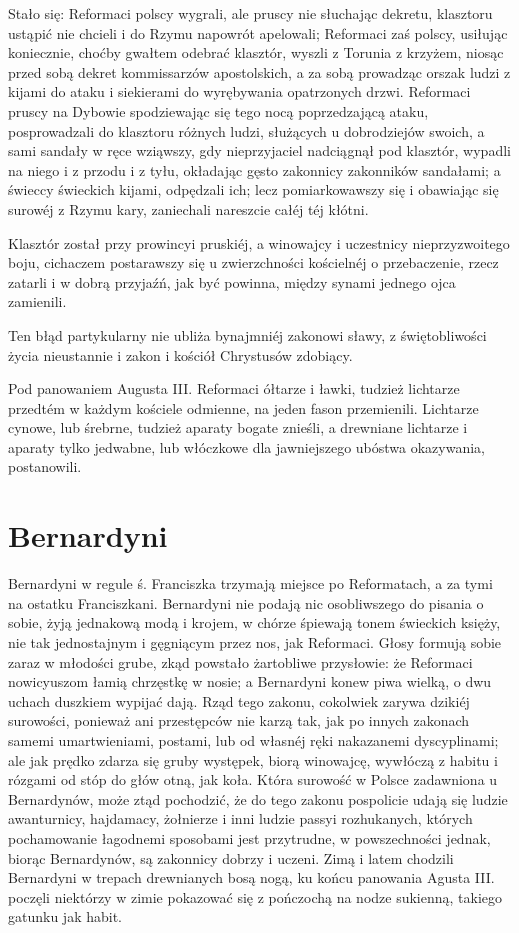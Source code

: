 \documentclass{book}
\begin{document}
Stało się: Reformaci polscy wygrali, ale pruscy nie słuchając dekretu, klasztoru ustąpić nie chcieli i do Rzymu napowrót apelowali; Reformaci zaś polscy, usiłując koniecznie, choćby gwałtem odebrać klasztór, wyszli z Torunia z krzyżem, niosąc przed sobą dekret kommissarzów apostolskich, a za sobą prowadząc orszak ludzi z kijami do ataku i siekierami do wyrębywania opatrzonych drzwi. Reformaci pruscy na Dybowie spodziewając się tego nocą poprzedzającą ataku, posprowadzali do klasztoru różnych ludzi, służących u dobrodziejów swoich, a sami sandały w ręce wziąwszy, gdy nieprzyjaciel nadciągnął pod klasztór, wypadli na niego i z przodu i z tyłu, okładając gęsto zakonnicy zakonników sandałami; a świeccy świeckich kijami, odpędzali ich; lecz pomiarkowawszy się i obawiając się surowéj z Rzymu kary, zaniechali nareszcie całéj téj kłótni.

Klasztór został przy prowincyi pruskiéj, a winowajcy i uczestnicy nieprzyzwoitego boju, cichaczem postarawszy się u zwierzchności kościelnéj o przebaczenie, rzecz zatarli i w dobrą przyjaźń, jak być powinna, między synami jednego ojca zamienili.

Ten błąd partykularny nie ubliża bynajmniéj zakonowi sławy, z świętobliwości życia nieustannie i zakon i kościół Chrystusów zdobiący.

Pod panowaniem Augusta III. Reformaci ółtarze i ławki, tudzież lichtarze przedtém w każdym kościele odmienne, na jeden fason przemienili. Lichtarze cynowe, lub śrebrne, tudzież aparaty bogate znieśli, a drewniane lichtarze i aparaty tylko jedwabne, lub włóczkowe dla jawniejszego ubóstwa okazywania, postanowili.

\section{Bernardyni}

Bernardyni w regule ś. Franciszka trzymają miejsce po Reformatach, a za tymi na ostatku Franciszkani. Bernardyni nie podają nic osobliwszego do pisania o sobie, żyją jednakową modą i krojem, w chórze śpiewają tonem świeckich księży, nie tak jednostajnym i gęgniącym przez nos, jak Reformaci. Głosy formują sobie zaraz w młodości grube, zkąd powstało żartobliwe przysłowie: że Reformaci nowicyuszom łamią chrzęstkę w nosie; a Bernardyni konew piwa wielką, o dwu uchach duszkiem wypijać dają. Rząd tego zakonu, cokolwiek zarywa dzikiéj surowości, ponieważ ani przestępców nie karzą tak, jak po innych zakonach samemi umartwieniami, postami, lub od własnéj ręki nakazanemi dyscyplinami; ale jak prędko zdarza się gruby występek, biorą winowajcę, wywłóczą z habitu i rózgami od stóp do głów otną, jak koła. Która surowość w Polsce zadawniona u Bernardynów, może ztąd pochodzić, że do tego zakonu pospolicie udają się ludzie awanturnicy, hajdamacy, żołnierze i inni ludzie passyi rozhukanych, których pochamowanie łagodnemi sposobami jest przytrudne, w powszechności jednak, biorąc Bernardynów, są zakonnicy dobrzy i uczeni. Zimą i latem chodzili Bernardyni w trepach drewnianych bosą nogą, ku końcu panowania Agusta III. poczęli niektórzy w zimie pokazować się z pończochą na nodze sukienną, takiego gatunku jak habit.
\end{document}
